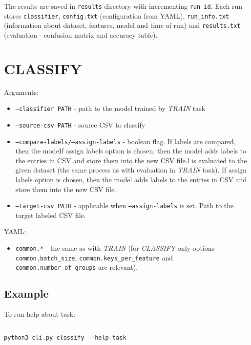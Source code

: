 The results are saved in \texttt{results} directory with incrementing \texttt{run\_id}. Each run stores \texttt{classifier}, \texttt{config.txt} (configuration from YAML), \texttt{run\_info.txt} (information about dataset, features, model and time of run) and \texttt{results.txt} (evaluation - confusion matrix and accuracy table).

\section{CLASSIFY}

\noindent
Arguments:

\begin{itemize}

\item \texttt{--classifier PATH} - path to the model trained by \textit{TRAIN} task
\item \texttt{--source-csv PATH} - source CSV to classify
\item \texttt{--compare-labels/--assign-labels} - boolean flag. If labels are compared, then the modeIf assign labels option is chosen, then the model adds labels to the entries in CSV and store them into the new CSV file.l is evaluated to the given dataset (the same process as with evaluation in \textit{TRAIN} task). If assign labels option is chosen, then the model adds labels to the entries in CSV and store them into the new CSV file.
\item \texttt{--target-csv PATH} - applicable when \texttt{--assign-labels} is set. Path to the target labeled CSV file.

\end{itemize}

\noindent
YAML:

\begin{itemize}

\item \texttt{common.*} - the same as with \textit{TRAIN} (for \textit{CLASSIFY} only options \texttt{common.batch\_size}, \texttt{common.keys\_per\_feature} and \texttt{common.number\_of\_groups} are relevant).

\end{itemize}

\subsection*{Example}

To run help about task:

\begin{verbatim}

python3 cli.py classify --help-task

\end{verbatim}


